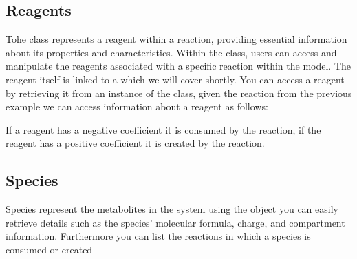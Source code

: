 \documentclass[letterpaper,10pt,english]{sphinxmanual}
\begin{document}
\subsection{Reagents}
\label{\detokenize{2_getting_started/home:reagents}}
\sphinxAtStartPar
Tohe  class  represents a reagent within a reaction, providing essential information about its properties and characteristics.
Within the class, users can access and manipulate the reagents associated with a specific reaction within the model. The reagent itself
is linked to a  which we will cover shortly.
You can access a reagent by retrieving it from an instance of the  class, given the  reaction from the previous example
we can access information about a reagent as follows:

\begin{sphinxVerbatim}[commandchars=\\\{\}]
   

 

 

 
\end{sphinxVerbatim}

\sphinxAtStartPar
If a reagent has a negative coefficient it is consumed by the reaction, if the reagent has a positive coefficient it is created by the reaction.


\subsection{Species}
\label{\detokenize{2_getting_started/home:species}}
\sphinxAtStartPar
Species represent the metabolites in the system using the  object you can easily retrieve details such as the species’ molecular formula, charge, and compartment information.
Furthermore you can list the reactions in which a species is consumed or created
\end{document}
